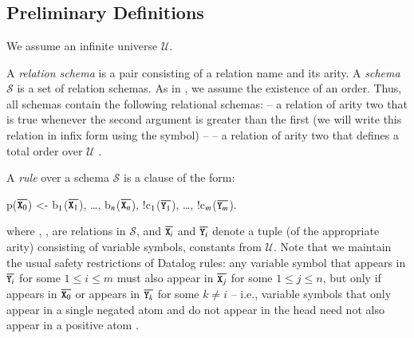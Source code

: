 \section{\large \bf \lang}
\label{sec:foundation}

\subsection{Preliminary Definitions}


We assume an infinite universe $\mathcal{U}$.

A {\em relation schema} is a pair consisting of a relation name and its arity.  A {\em schema} $\mathcal{S}$ is a set of relation schemas.  As in , we assume the existence of an order.  Thus, all schemas contain the following relational schemas:  -- a relation of arity two that is true whenever the second argument is greater than the first (we will write this relation in infix form using the \dedalus{<} symbol) --  -- a relation of arity two that defines a total order over $\mathcal{U}$ .

A {\em rule} over a schema $\mathcal{S}$ is a clause of the form:

\begin{Dedalus}
p(\(\overline{\dedalus{X}\sb{0}}\)) <- b\(\sb{1}\)({\(\overline{\dedalus{X}\sb{1}}\)}), \ldots, b\(\sb{n}\)(\(\overline{\dedalus{X}\sb{n}}\)),
!c\(\sb{1}\)(\(\overline{\dedalus{Y}\sb{1}}\)), \ldots, !c\(\sb{m}\)(\(\overline{\dedalus{Y}\sb{m}}\)).
\end{Dedalus}

where , ,  are relations in $\mathcal{S}$, and $\overline{\dedalus{X}_i}$ and $\overline{\dedalus{Y}_i}$ denote a tuple (of the appropriate arity) consisting of variable symbols, constants from $\mathcal{U}$.  Note that we maintain the usual safety restrictions of Datalog rules: any variable symbol  that appears in $\overline{\dedalus{Y}_i}$ for some $1 \leq i \leq m$ must also appear in $\overline{\dedalus{X}_j}$ for some $1 \leq j \leq n$, but only if  appears in $\overline{\dedalus{X}_0}$ or  appears in $\overline{\dedalus{Y}_k}$ for some $k \neq i$ -- i.e., variable symbols that only appear in a single negated atom and do not appear in the head need not also appear in a positive atom .

